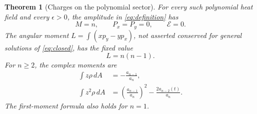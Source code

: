 \documentclass[11pt]{article}
\newcommand{\dd}{\,d}
\newcommand{\eps}{\epsilon}
\newcommand{\cE}{\mathcal E}
\newtheorem{theorem}{Theorem}[section]
\theoremstyle{definition}
\theoremstyle{remark}
\begin{document}
\begin{theorem}[Charges on the polynomial sector]
\label{thm:polycharges}
For every such polynomial heat field and every $\eps>0$, the
amplitude in \eqref{eq:definition} has
\begin{equation}
 M=n,\qquad P_x=P_y=0,\qquad\cE=0.
 \label{eq:polycharges}
\end{equation}
The angular moment $L=\int(xp_y-yp_x)$, not asserted conserved for
general solutions of \eqref{eq:closed}, has the fixed value
\begin{equation}
 L=n(n-1). \label{eq:polyangular}
\end{equation}
For $n\ge2$, the complex moments are
\begin{align}
 \int z\rho\dd A&=-\frac{a_{n-1}}{a_n},\label{eq:firstmoment}\\
 \int z^2\rho\dd A
 &=\left(\frac{a_{n-1}}{a_n}\right)^2
    -\frac{2a_{n-2}(t)}{a_n}.
 \label{eq:secondmoment}
\end{align}
The first-moment formula also holds for $n=1$.
\end{theorem}
\end{document}
